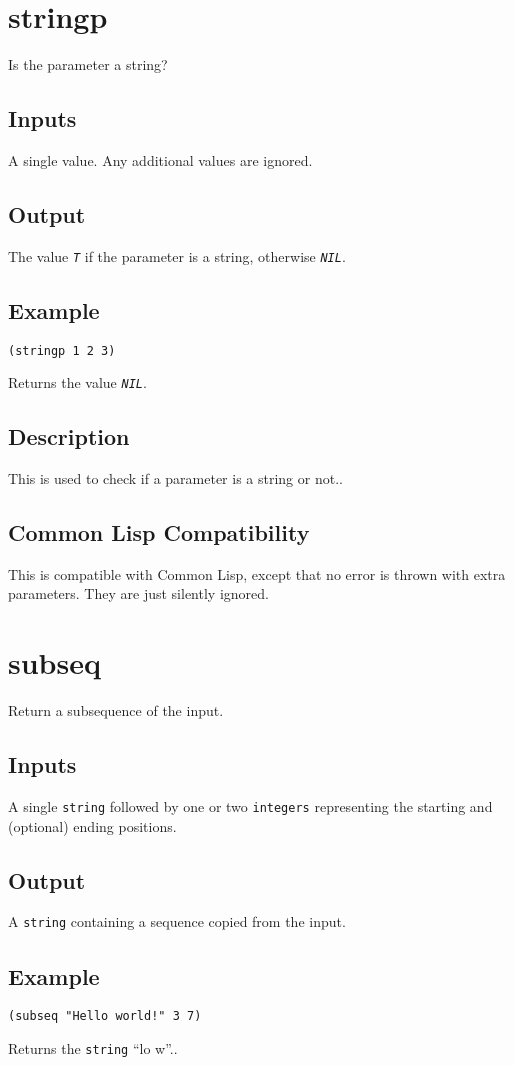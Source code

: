 \documentclass[10pt, openany]{book}
\newcommand{\constant}[1]{\emph{\texttt{#1}}}
\newcommand{\datatype}[1]{\texttt{#1}}
\newcommand{\cl}{Common Lisp}
\begin{document}
\section{stringp}
Is the parameter a string?
\subsection{Inputs}
A single value.  Any additional values are ignored.
\subsection{Output}
The value \constant{T} if the parameter is a string, otherwise \constant{NIL}.
\subsection{Example}
\begin{lstlisting}
(stringp 1 2 3)
\end{lstlisting}
Returns the value \constant{NIL}.
\subsection{Description}
This is used to check if a parameter is a string or not..
\subsection{Common Lisp Compatibility}
This is compatible with \cl, except that no error is thrown with extra parameters.  They are just silently ignored.

\section{subseq}
Return a subsequence of the input.
\subsection{Inputs}
A single \datatype{string} followed by one or two \datatype{integers} representing the starting and (optional) ending positions.
\subsection{Output}
A \datatype{string} containing a sequence copied from the input.
\subsection{Example}
\begin{lstlisting}
(subseq "Hello world!" 3 7)
\end{lstlisting}
Returns the \datatype{string} ``lo w''..
\end{document}
